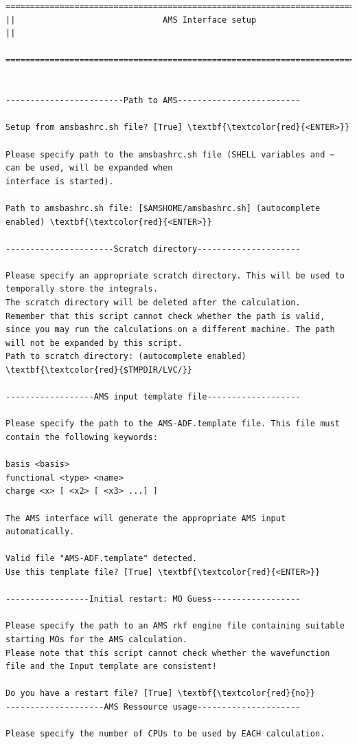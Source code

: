 \documentclass[a4paper,11pt,DIV=15,openany]{scrbook}
\begin{document}
\begin{oframed}
\begin{Verbatim}[commandchars=\\\{\}]
================================================================================
||                              AMS Interface setup                               ||
  ================================================================================


------------------------Path to AMS-------------------------

Setup from amsbashrc.sh file? [True] \textbf{\textcolor{red}{<ENTER>}}

Please specify path to the amsbashrc.sh file (SHELL variables and ~ can be used, will be expanded when 
interface is started).

Path to amsbashrc.sh file: [$AMSHOME/amsbashrc.sh] (autocomplete enabled) \textbf{\textcolor{red}{<ENTER>}}

----------------------Scratch directory---------------------

Please specify an appropriate scratch directory. This will be used to temporally store the integrals. 
The scratch directory will be deleted after the calculation. 
Remember that this script cannot check whether the path is valid, 
since you may run the calculations on a different machine. The path will not be expanded by this script.
Path to scratch directory: (autocomplete enabled) \textbf{\textcolor{red}{$TMPDIR/LVC/}}

------------------AMS input template file-------------------

Please specify the path to the AMS-ADF.template file. This file must contain the following keywords:

basis <basis>
functional <type> <name>
charge <x> [ <x2> [ <x3> ...] ]

The AMS interface will generate the appropriate AMS input automatically.

Valid file "AMS-ADF.template" detected. 
Use this template file? [True] \textbf{\textcolor{red}{<ENTER>}}

-----------------Initial restart: MO Guess------------------

Please specify the path to an AMS rkf engine file containing suitable starting MOs for the AMS calculation. 
Please note that this script cannot check whether the wavefunction file and the Input template are consistent!

Do you have a restart file? [True] \textbf{\textcolor{red}{no}}
--------------------AMS Ressource usage---------------------

Please specify the number of CPUs to be used by EACH calculation.


\end{Verbatim}
\end{oframed}
\end{document}

